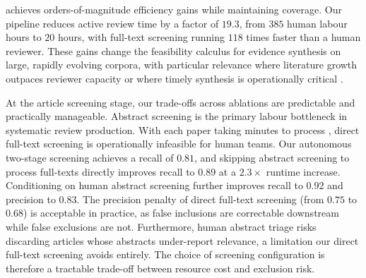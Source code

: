
\name{} achieves orders-of-magnitude efficiency gains while maintaining coverage. Our pipeline reduces active review time by a factor of $19.3$, from $385$ human labour hours to $20$ hours, with full-text screening running $118$ times faster than a human reviewer. These gains change the feasibility calculus for evidence synthesis on large, rapidly evolving corpora, with particular relevance where literature growth outpaces reviewer capacity \citep{bergstrom2026screening} or where timely synthesis is operationally critical \citep{orton2011use, clarke2017evidence}.



At the article screening stage, our trade-offs across ablations are predictable and practically manageable. Abstract screening is the primary labour bottleneck in systematic review production. With each paper taking minutes to process \citep{wallace2010semi}, direct full-text screening is operationally infeasible for human teams. Our autonomous two-stage screening achieves a recall of $0.81$, and skipping abstract screening to process full-texts directly improves recall to $0.89$ at a $2.3\times$ runtime increase. Conditioning on human abstract screening further improves recall to $0.92$ and precision to $0.83$. The precision penalty of direct full-text screening (from $0.75$ to $0.68$) is acceptable in practice, as false inclusions are correctable downstream while false exclusions are not. Furthermore, human abstract triage risks discarding articles whose abstracts under-report relevance, a limitation our direct full-text screening avoids entirely. The choice of screening configuration is therefore a tractable trade-off between resource cost and exclusion risk.

